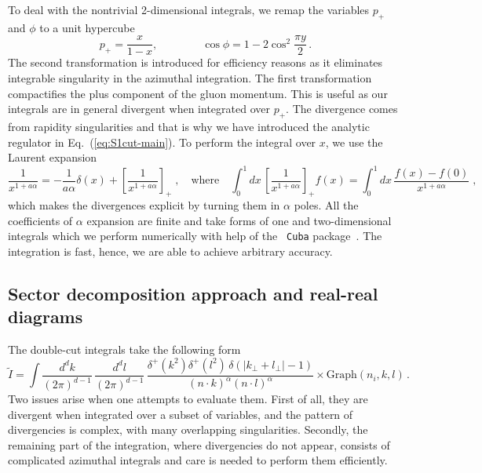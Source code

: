 \documentclass[a4paper,11pt]{article}
\newcommand{\gdp}{\text{Graph}(n_i, k, l)}
\numberwithin{equation}{section}
\begin{document}
To deal with the nontrivial 2-dimensional integrals, we remap the variables
$p_+$ and $\phi$ to a unit hypercube
%
\begin{equation}
  p_+ = \frac{x}{1-x},
  \qquad \qquad
  \cos \phi = 1- 2 \cos^2\frac{\pi y}{2}\,.
\end{equation}
%
The second transformation is introduced for efficiency reasons as it eliminates
integrable singularity in the azimuthal integration. The first transformation
compactifies the plus component of the gluon momentum. This is useful as our
integrals are in general divergent when integrated over $p_+$. The
divergence comes from rapidity singularities and that is why we have introduced
the analytic regulator in Eq.~(\ref{eq:S1cut-main}).
%
To perform the integral over $x$, we use the Laurent expansion
%
\begin{equation}
  \frac{1}{x^{1+a\alpha}} = -\frac{1}{a\alpha} \delta(x) + \left[
    \frac{1}{x^{1+a\alpha}} \right]_+ \; ,
  \quad
  \text{where}
  \quad
  \int_0^1\!\! dx \, \left[ \frac{1}{x^{1+a\alpha}} \right]_+\!\! f(x) =
  \int_0^1\!\! dx \, \frac{f(x)-f(0)}{x^{1+a\alpha}} \; ,
\end{equation}
%
which makes the divergences explicit by turning them in $\alpha$ poles. All
the coefficients of $\alpha$ expansion are finite and take forms of one and
two-dimensional integrals which we perform numerically with help of the {\tt
Cuba} package~\cite{Hahn:2004fe, Hahn:2014fua}. 
%
The integration is fast, hence, we are able to achieve arbitrary accuracy.


\subsection{Sector decomposition approach and real-real diagrams}
\label{sec:secdec}

The double-cut integrals take the following form
%
\begin{equation}
  \tilde I = 
  \int \frac{d^d k}{(2\pi)^{d-1}}\, \frac{d^d l}{(2\pi)^{d-1}}\, 
  \frac{\delta^+(k^2) \delta^+(l^2)\,
  \delta(|k_\perp+l_\perp|-1)}
  {(n\cdot k)^{\alpha} (n\cdot l)^\alpha}
  \times \gdp\,.
  \label{eq:int2cutgen}
\end{equation}
%
Two issues arise when one attempts to evaluate them. First of all, 
they are divergent when integrated over a subset of variables, and the pattern
of divergencies is complex, with many overlapping singularities. Secondly, the
remaining part of the integration, where divergencies do not appear, consists of
complicated azimuthal integrals and care is needed to perform them efficiently.
\end{document}
